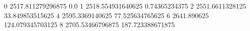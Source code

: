 0 2517.811279296875 0.0
1 2518.554931640625 0.74365234375
2 2551.6611328125 33.849853515625
4 2595.3369140625 77.525634765625
6 2641.890625 124.079345703125
8 2705.53466796875 187.723388671875
